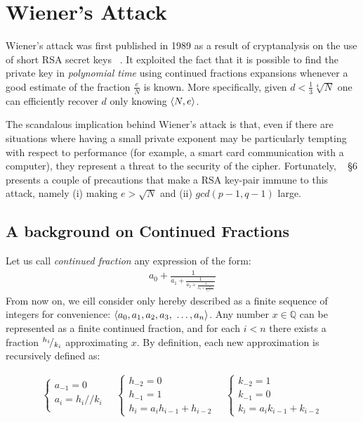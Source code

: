 \chapter{Wiener's Attack \label{chap:wiener}}

Wiener's attack was first published in 1989 as a result of cryptanalysis on the
use of short RSA secret keys ~\cite{wiener}. It exploited the fact that it is
possible to find the private key in \emph{polynomial time} using continued fractions
expansions whenever a good estimate of the fraction $\frac{e}{N}$ is known.
More specifically, given $d < \frac{1}{3} \sqrt[4]{N}$ one can efficiently
recover $d$ only knowing $\langle N, e\rangle$.

The scandalous implication behind Wiener's attack is that, even if there are
situations where having a small private exponent may be
particularly tempting with respect to performance (for example, a smart card
communication with a computer), they represent a threat to the security of the
cipher.
Fortunately, ~\cite{wiener} \S 6 presents a couple of precautions that make a
RSA key-pair immune to this attack, namely
(i) making $e > \sqrt{N}$ and
(ii) $gcd(p-1, q-1)$ large.

\section{A background on Continued Fractions \label{sec:wiener:cf}}

Let us call \emph{continued fraction} any expression of the form:
\begin{align*}
a_0 + \frac{1}{a_1
    + \frac{1}{a_2
    + \frac{1}{a_3
    + \frac{1}{a_4 + \ldots}}}}
\end{align*}
From now on, we eill consider only hereby described as a finite sequence of integers for convenience:
$\angular{a_0, a_1, a_2, a_3,  \ \ldots, a_n}$.
Any number $x \in \mathbb{Q}$ can be represented as a finite continued fraction,
and for each $i < n$ there exists a fraction ${}^{h_i}\!/_{k_i}$ approximating
$x$.
By definition, each new approximation is recursively defined as:

\begin{align}
  \label{eq:wiener:cf}
  \begin{cases}
    a_{-1} = 0 \\
    a_i = h_i // k_i \\
  \end{cases}
  \quad
  \begin{cases}
    h_{-2} = 0 \\
    h_{-1} = 1 \\
    h_i = a_i h_{i-1} + h_{i-2}
  \end{cases}
  \quad
  \begin{cases}
    k_{-2} = 1 \\
    k_{-1} = 0  \\
    k_i = a_i k_{i-1} + k_{i-2}
  \end{cases}
\end{align}

